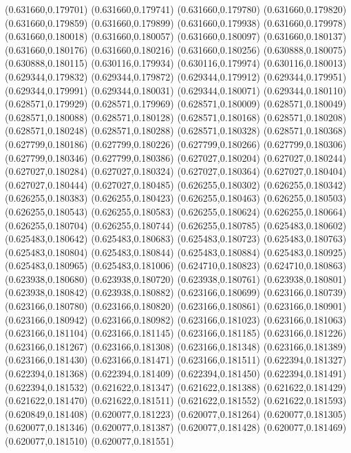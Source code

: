 (0.631660,0.179701)
(0.631660,0.179741)
(0.631660,0.179780)
(0.631660,0.179820)
(0.631660,0.179859)
(0.631660,0.179899)
(0.631660,0.179938)
(0.631660,0.179978)
(0.631660,0.180018)
(0.631660,0.180057)
(0.631660,0.180097)
(0.631660,0.180137)
(0.631660,0.180176)
(0.631660,0.180216)
(0.631660,0.180256)
(0.630888,0.180075)
(0.630888,0.180115)
(0.630116,0.179934)
(0.630116,0.179974)
(0.630116,0.180013)
(0.629344,0.179832)
(0.629344,0.179872)
(0.629344,0.179912)
(0.629344,0.179951)
(0.629344,0.179991)
(0.629344,0.180031)
(0.629344,0.180071)
(0.629344,0.180110)
(0.628571,0.179929)
(0.628571,0.179969)
(0.628571,0.180009)
(0.628571,0.180049)
(0.628571,0.180088)
(0.628571,0.180128)
(0.628571,0.180168)
(0.628571,0.180208)
(0.628571,0.180248)
(0.628571,0.180288)
(0.628571,0.180328)
(0.628571,0.180368)
(0.627799,0.180186)
(0.627799,0.180226)
(0.627799,0.180266)
(0.627799,0.180306)
(0.627799,0.180346)
(0.627799,0.180386)
(0.627027,0.180204)
(0.627027,0.180244)
(0.627027,0.180284)
(0.627027,0.180324)
(0.627027,0.180364)
(0.627027,0.180404)
(0.627027,0.180444)
(0.627027,0.180485)
(0.626255,0.180302)
(0.626255,0.180342)
(0.626255,0.180383)
(0.626255,0.180423)
(0.626255,0.180463)
(0.626255,0.180503)
(0.626255,0.180543)
(0.626255,0.180583)
(0.626255,0.180624)
(0.626255,0.180664)
(0.626255,0.180704)
(0.626255,0.180744)
(0.626255,0.180785)
(0.625483,0.180602)
(0.625483,0.180642)
(0.625483,0.180683)
(0.625483,0.180723)
(0.625483,0.180763)
(0.625483,0.180804)
(0.625483,0.180844)
(0.625483,0.180884)
(0.625483,0.180925)
(0.625483,0.180965)
(0.625483,0.181006)
(0.624710,0.180823)
(0.624710,0.180863)
(0.623938,0.180680)
(0.623938,0.180720)
(0.623938,0.180761)
(0.623938,0.180801)
(0.623938,0.180842)
(0.623938,0.180882)
(0.623166,0.180699)
(0.623166,0.180739)
(0.623166,0.180780)
(0.623166,0.180820)
(0.623166,0.180861)
(0.623166,0.180901)
(0.623166,0.180942)
(0.623166,0.180982)
(0.623166,0.181023)
(0.623166,0.181063)
(0.623166,0.181104)
(0.623166,0.181145)
(0.623166,0.181185)
(0.623166,0.181226)
(0.623166,0.181267)
(0.623166,0.181308)
(0.623166,0.181348)
(0.623166,0.181389)
(0.623166,0.181430)
(0.623166,0.181471)
(0.623166,0.181511)
(0.622394,0.181327)
(0.622394,0.181368)
(0.622394,0.181409)
(0.622394,0.181450)
(0.622394,0.181491)
(0.622394,0.181532)
(0.621622,0.181347)
(0.621622,0.181388)
(0.621622,0.181429)
(0.621622,0.181470)
(0.621622,0.181511)
(0.621622,0.181552)
(0.621622,0.181593)
(0.620849,0.181408)
(0.620077,0.181223)
(0.620077,0.181264)
(0.620077,0.181305)
(0.620077,0.181346)
(0.620077,0.181387)
(0.620077,0.181428)
(0.620077,0.181469)
(0.620077,0.181510)
(0.620077,0.181551)
